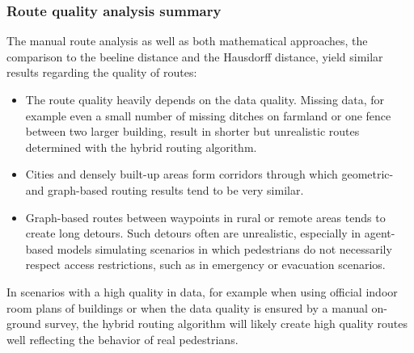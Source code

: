		\subsubsection{Route quality analysis summary}
			
			The manual route analysis as well as both mathematical approaches, the comparison to the beeline distance and the Hausdorff distance, yield similar results regarding the quality of routes:
			
			\begin{itemize}
				\item The route quality heavily depends on the data quality.
				Missing data, for example even a small number of missing ditches on farmland or one fence between two larger building, result in shorter but unrealistic routes determined with the hybrid routing algorithm.
				\item Cities and densely built-up areas form corridors through which geometric- and graph-based routing results tend to be very similar.
				\item Graph-based routes between waypoints in rural or remote areas tends to create long detours.
				Such detours often are unrealistic, especially in agent-based models simulating scenarios in which pedestrians do not necessarily respect access restrictions, such as in emergency or evacuation scenarios.
			\end{itemize}
			\noindent
			In scenarios with a high quality in data, for example when using official indoor room plans of buildings or when the data quality is ensured by a manual on-ground survey, the hybrid routing algorithm will likely create high quality routes well reflecting the behavior of real pedestrians.